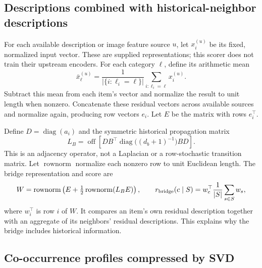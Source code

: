 \documentclass[11pt,a4paper]{article}
\newcommand{\off}{\operatorname{off}}
\newcommand{\diag}{\operatorname{diag}}
\newcommand{\rownorm}{\operatorname{rownorm}}
\begin{document}
\subsection{Descriptions combined with historical-neighbor descriptions}

For each available description or image feature source $u$, let
$x_i^{(u)}$ be its fixed, normalized input vector. These are supplied
representations; this scorer does not train their upstream encoders.
For each category $\ell$, define its arithmetic mean
\begin{equation}
 \bar x_\ell^{(u)}=
 \frac{1}{|\{i:\ell_i=\ell\}|}
       \sum_{i:\ell_i=\ell}x_i^{(u)}.
\end{equation}
Subtract this mean from each item's vector and normalize the result to unit
length when nonzero. Concatenate these residual vectors across available
sources and normalize again, producing row vectors $e_i$. Let $E$ be the
matrix with rows $e_i^\top$.

Define $D=\diag(a_i)$ and the symmetric historical propagation matrix
\begin{equation}
 L_B=\off\left[D B^\top
       \diag\big((d_b+1)^{-1}\big) B D\right].
\end{equation}
This is an adjacency operator, not a Laplacian or a row-stochastic transition
matrix. Let $\rownorm$ normalize each nonzero row to unit Euclidean length.
The bridge representation and score are
\begin{equation}
 W=\rownorm\left(E+\tfrac12\rownorm(L_BE)\right),\qquad
 r_{\rm bridge}(c\mid S)=w_c^\top\frac1{|S|}\sum_{s\in S}w_s,
\end{equation}
where $w_i^\top$ is row $i$ of $W$. It compares an item's own residual
description together with an aggregate of its neighbors' residual
descriptions. This explains why the bridge includes historical information.

\subsection{Co-occurrence profiles compressed by SVD}
\end{document}
